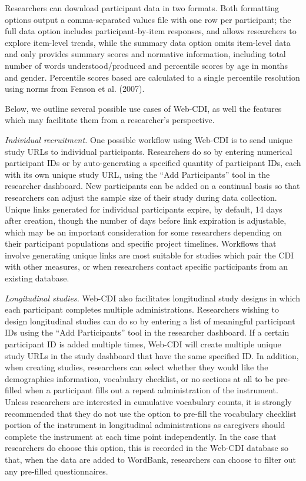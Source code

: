 \documentclass[
  english,
  ,man,floatsintext]{apa6}
\begin{document}
Researchers can download participant data in two formats. Both formatting options output a comma-separated values file with one row per participant; the full data option includes participant-by-item responses, and allows researchers to explore item-level trends, while the summary data option omits item-level data and only provides summary scores and normative information, including total number of words understood/produced and percentile scores by age in months and gender. Percentile scores based are calculated to a single percentile resolution using norms from Fenson et al. (2007).

Below, we outline several possible use cases of Web-CDI, as well the features which may facilitate them from a researcher's perspective.

\emph{Individual recruitment.} One possible workflow using Web-CDI is to send unique study URLs to individual participants. Researchers do so by entering numerical participant IDs or by auto-generating a specified quantity of participant IDs, each with its own unique study URL, using the ``Add Participants'' tool in the researcher dashboard. New participants can be added on a continual basis so that researchers can adjust the sample size of their study during data collection. Unique links generated for individual participants expire, by default, 14 days after creation, though the number of days before link expiration is adjustable, which may be an important consideration for some researchers depending on their participant populations and specific project timelines. Workflows that involve generating unique links are most suitable for studies which pair the CDI with other measures, or when researchers contact specific participants from an existing database.

\emph{Longitudinal studies.} Web-CDI also facilitates longitudinal study designs in which each participant completes multiple administrations. Researchers wishing to design longitudinal studies can do so by entering a list of meaningful participant IDs using the ``Add Participants'' tool in the researcher dashboard. If a certain participant ID is added multiple times, Web-CDI will create multiple unique study URLs in the study dashboard that have the same specified ID. In addition, when creating studies, researchers can select whether they would like the demographics information, vocabulary checklist, or no sections at all to be pre-filled when a participant fills out a repeat administration of the instrument. Unless researchers are interested in cumulative vocabulary counts, it is strongly recommended that they do not use the option to pre-fill the vocabulary checklist portion of the instrument in longitudinal administrations as caregivers should complete the instrument at each time point independently. In the case that researchers do choose this option, this is recorded in the Web-CDI database so that, when the data are added to WordBank, researchers can choose to filter out any pre-filled questionnaires.
\end{document}
